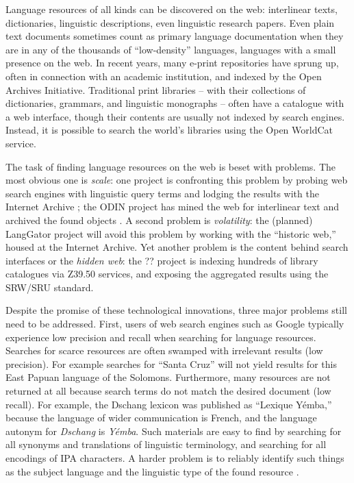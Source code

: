 
Language resources of all kinds can be discovered on the web:
interlinear texts, dictionaries, linguistic descriptions, even
linguistic research papers.  Even plain text documents sometimes count
as primary language documentation when they are in any of the
thousands of ``low-density'' languages, languages with a small
presence on the web.  In recent years, many e-print repositories have
sprung up, often in connection with an academic institution, and
indexed by the Open Archives Initiative.  Traditional print libraries
-- with their collections of dictionaries, grammars, and linguistic
monographs -- often have a catalogue with a web interface, though
their contents are usually not indexed by search engines.  Instead,
it is possible to search the world's libraries using the Open WorldCat
service.


The task of finding language resources on the web is beset with
problems.  The most obvious one is \emph{scale}: one project is
confronting this problem by probing web search engines with linguistic
query terms and lodging the results with the Internet Archive
\citep{BaldwinBird06}; the ODIN project has mined the web for
interlinear text and archived the found objects
\citep{Langendoen02,Lewis03}.  A second problem is \emph{volatility}:
the (planned) LangGator project will avoid this problem by working
with the ``historic web,'' housed at the Internet Archive.  Yet
another problem is the content behind search interfaces or the
\emph{hidden web}: the ?? project is indexing hundreds of library
catalogues via Z39.50 services, and exposing the aggregated results
using the SRW/SRU standard.


Despite the promise of these technological innovations, three major
problems still need to be addressed.
First, users of web search engines such as Google typically experience
low precision and recall when searching for language resources.
Searches for scarce resources are often swamped with irrelevant
results (low precision).  For example searches for ``Santa Cruz'' will
not yield results for this East Papuan language of the Solomons.
Furthermore, many resources are not returned at all because search
terms do not match the desired document (low recall).  For example,
the Dschang lexicon \cite{BirdTadadjeu97} was published as
``Lexique Y\'emba,'' because the language of wider communication is
French, and the language autonym for \textit{Dschang} is \textit{Y\'emba}.
Such materials are easy to find by searching for all synonyms and
translations of linguistic terminology, and searching for all
encodings of IPA characters.  A harder problem is to
reliably identify such things as the subject language and the
linguistic type of the found resource \citep{HughesBaldwin06lrec}.

